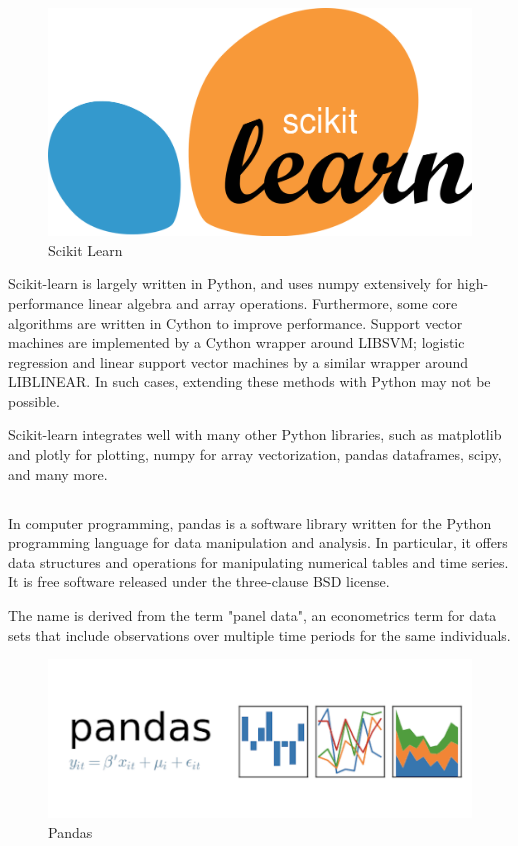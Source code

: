 \documentclass[12pt]{article}
\newcommand{\msize}{\fontsize{14pt}{12pt}\selectfont}
\begin{document}
\begin{center}
\begin{figure}[h]
\centerline{\includegraphics[scale=.15]{IMG_8210.png}}
\caption{Scikit Learn}
\end{figure}
\end{center}

 
Scikit-learn is largely written in Python, and uses numpy extensively for high-performance linear algebra and array operations. Furthermore, some core algorithms are written in Cython to improve performance. Support vector machines are implemented by a Cython wrapper around LIBSVM; logistic regression and linear support vector machines by a similar wrapper around LIBLINEAR. In such cases, extending these methods with Python may not be possible.

Scikit-learn integrates well with many other Python libraries, such as matplotlib and plotly for plotting, numpy for array vectorization, pandas dataframes, scipy, and many more.
\newpage
\subsection{\msize{\textbf{PANDAS}}}
In computer programming, pandas is a software library written for the Python programming language for data manipulation and analysis. In particular, it offers data structures and operations for manipulating numerical tables and time series. It is free software released under the three-clause BSD license.

The name is derived from the term "panel data", an econometrics term for data sets that include observations over multiple time periods for the same individuals.

\begin{center}
\begin{figure}[h]
\centerline{\includegraphics[scale=.4]{IMG_8211.png}}
\caption{Pandas}
\end{figure}
\end{center}
\end{document}
